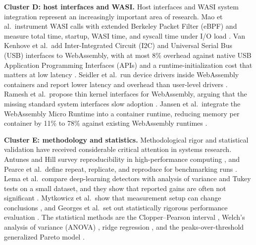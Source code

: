 \documentclass{ws-jcsc}
\begin{document}
\textbf{Cluster D: host interfaces and WASI.} Host interfaces and WASI system integration represent an increasingly important area of research. Mao et al.\ instrument WASI calls with extended Berkeley Packet Filter (eBPF) and measure total time, startup, WASI time, and syscall time under I/O load \cite{mao2024ewapa}. Van Kenhove et al.\ add Inter-Integrated Circuit (I2C) and Universal Serial Bus (USB) interfaces to WebAssembly, with at most 8\% overhead against native USB Application Programming Interfaces (APIs) and a runtime-initialization cost that matters at low latency \cite{vankenhove2025cyberphysical}. Seidler et al.\ run device drivers inside WebAssembly containers and report lower latency and overhead than user-level drivers \cite{seidler2025wasmio}. Ramesh et al.\ propose thin kernel interfaces for WebAssembly, arguing that the missing standard system interfaces slow adoption \cite{ramesh2025thin}. Jansen et al.\ integrate the WebAssembly Micro Runtime into a container runtime, reducing memory per container by 11\% to 78\% against existing WebAssembly runtimes \cite{jansen2025memory}.

\textbf{Cluster E: methodology and statistics.} Methodological rigor and statistical validation have received considerable critical attention in systems research. Antunes and Hill survey reproducibility in high-performance computing \cite{antunes2024reproducibility}, and Pearce et al.\ define repeat, replicate, and reproduce for benchmarking runs \cite{pearce2025hpc}. Lema et al.\ compare deep-learning detectors with analysis of variance and Tukey tests on a small dataset, and they show that reported gains are often not significant \cite{lema2026benchmarking}. Mytkowicz et al.\ show that measurement setup can change conclusions \cite{mytkowicz2009wrong}, and Georges et al.\ set out statistically rigorous performance evaluation \cite{georges2007java}. The statistical methods are the Clopper--Pearson interval \cite{clopper1934use}, Welch's analysis of variance (ANOVA) \cite{welch1951comparison}, ridge regression \cite{hoerl1970ridge}, and the peaks-over-threshold generalized Pareto model \cite{davison1990exceedances}.
\end{document}
